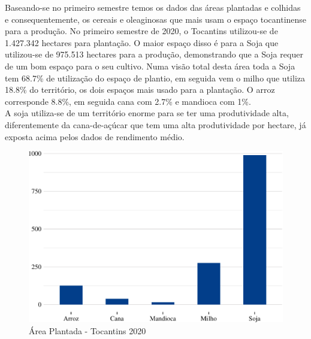 \par Baseando-se no primeiro semestre temos os dados das áreas plantadas e colhidas e consequentemente, os cereais e oleaginosas que mais usam o espaço tocantinense para a produção. No primeiro semestre de 2020, o Tocantins utilizou-se de 1.427.342 hectares para plantação. O maior espaço disso é para a Soja que utilizou-se de 975.513 hectares para a produção, demonstrando que a Soja requer de um bom espaço para o seu cultivo. Numa visão total desta área toda a Soja tem 68.7\% de utilização do espaço de plantio, em seguida vem o milho que utiliza 18.8\% do território, os dois espaços mais usado para a plantação. O arroz corresponde 8.8\%, em seguida cana com 2.7\% e mandioca com 1\%.
\\
A soja utiliza-se de um território enorme para se ter uma produtividade alta, diferentemente da cana-de-açúcar que tem uma alta produtividade por hectare, já exposta acima pelos dados de rendimento médio.
\begin{figure}[h]
	\caption{Área Plantada - Tocantins 2020}
	\includegraphics{fig/area_plantada-1.pdf}
\end{figure}

